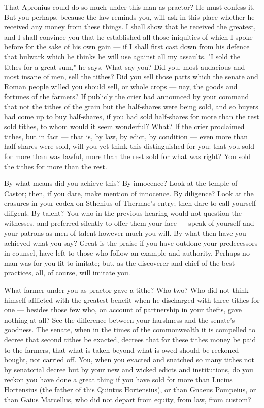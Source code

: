  That Apronius could do so much under this man as praetor? He must confess it. But you perhaps, because the law reminds you, will ask in this place whether he received any money from these things. I shall show that he received the greatest, and I shall convince you that he established all those iniquities of which I spoke before for the sake of his own gain --- if I shall first cast down from his defence that bulwark which he thinks he will use against all my assaults. "I sold the tithes for a great sum," he says. What say you? Did you, most audacious and most insane of men, sell the tithes? Did you sell those parts which the senate and Roman people willed you should sell, or whole crops --- nay, the goods and fortunes of the farmers? If publicly the crier had announced by your command that not the tithes of the grain but the half-shares were being sold, and so buyers had come up to buy half-shares, if you had sold half-shares for more than the rest sold tithes, to whom would it seem wonderful? What? If the crier proclaimed tithes, but in fact --- that is, by law, by edict, by condition --- even more than half-shares were sold, will you yet think this distinguished for you: that you sold for more than was lawful, more than the rest sold for what was right? You sold the tithes for more than the rest.

 By what means did you achieve this? By innocence? Look at the temple of Castor; then, if you dare, make mention of innocence. By diligence? Look at the erasures in your codex on Sthenius of Thermae's entry; then dare to call yourself diligent. By talent? You who in the previous hearing would not question the witnesses, and preferred silently to offer them your face --- speak of yourself and your patrons as men of talent however much you will. By what then have you achieved what you say? Great is the praise if you have outdone your predecessors in counsel, have left to those who follow an example and authority. Perhaps no man was for you fit to imitate; but, as the discoverer and chief of the best practices, all, of course, will imitate you.

 What farmer under you as praetor gave a tithe? Who two? Who did not think himself afflicted with the greatest benefit when he discharged with three tithes for one --- besides those few who, on account of partnership in your thefts, gave nothing at all? See the difference between your harshness and the senate's goodness. The senate, when in the times of the commonwealth it is compelled to decree that second tithes be exacted, decrees that for these tithes money be paid to the farmers, that what is taken beyond what is owed should be reckoned bought, not carried off. You, when you exacted and snatched so many tithes not by senatorial decree but by your new and wicked edicts and institutions, do you reckon you have done a great thing if you have sold for more than Lucius Hortensius (the father of this Quintus Hortensius), or than Gnaeus Pompeius, or than Gaius Marcellus, who did not depart from equity, from law, from custom?

